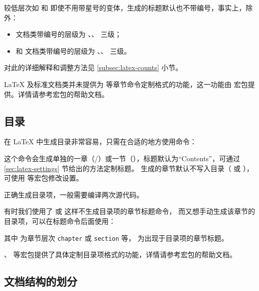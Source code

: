 较低层次如  和  即使不用带星号的变体，生成的标题默认也不带编号，事实上，除  外：
\begin{itemize}
  \item {} 文档类带编号的层级为 、、 三级；
  \item {} 和  文档类带编号的层级为 、、 三级。
\end{itemize}
对此的详细解释和调整方法见 \ref{subsec:latex-counts} 小节。

\LaTeX{} 及标准文档类并未提供为  等章节命令定制格式的功能，这一功能由  宏包提供。详情请参考宏包的帮助文档。

\subsection{目录}\label{sec:toc}

在 \LaTeX{} 中生成目录非常容易，只需在合适的地方使用命令：
\begin{command}
\end{command}

这个命令会生成单独的一章（/）或一节（），标题默认为“Contents”，可通过 \ref{sec:latex-settings} 节给出的方法定制标题。
 生成的章节默认不写入目录（ 或 ），可使用  等宏包修改设置。

正确生成目录项，一般需要编译两次源代码。

有时我们使用了  或  这样不生成目录项的章节标题命令，
而又想手动生成该章节的目录项，可以在标题命令后面使用：
\begin{command}
\end{command}

其中  为章节层次 \texttt{chapter} 或 \texttt{section} 等， 为出现于目录项的章节标题。

、 等宏包提供了具体定制目录项格式的功能，详情请参考宏包的帮助文档。

\subsection{文档结构的划分}\label{sec:matters}

